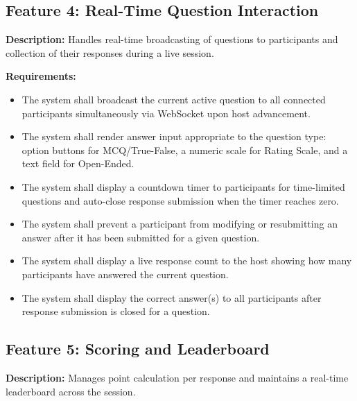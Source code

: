 \documentclass[12pt,a4paper]{article}
\begin{document}
\subsection{Feature 4: Real-Time Question Interaction}
\textbf{Description:} Handles real-time broadcasting of questions to participants
and collection of their responses during a live session.

\textbf{Requirements:}
\begin{itemize}
  \item[\textbf{FR29:}] The system shall broadcast the current active question to all
        connected participants simultaneously via WebSocket upon host advancement.
  \item[\textbf{FR30:}] The system shall render answer input appropriate to the
        question type: option buttons for MCQ/True-False, a numeric scale for Rating
        Scale, and a text field for Open-Ended.
  \item[\textbf{FR31:}] The system shall display a countdown timer to participants
        for time-limited questions and auto-close response submission when the timer
        reaches zero.
  \item[\textbf{FR32:}] The system shall prevent a participant from modifying or
        resubmitting an answer after it has been submitted for a given question.
  \item[\textbf{FR33:}] The system shall display a live response count to the host
        showing how many participants have answered the current question.
  \item[\textbf{FR34:}] The system shall display the correct answer(s) to all
        participants after response submission is closed for a question.
\end{itemize}

\subsection{Feature 5: Scoring and Leaderboard}
\textbf{Description:} Manages point calculation per response and maintains a
real-time leaderboard across the session.
\end{document}
